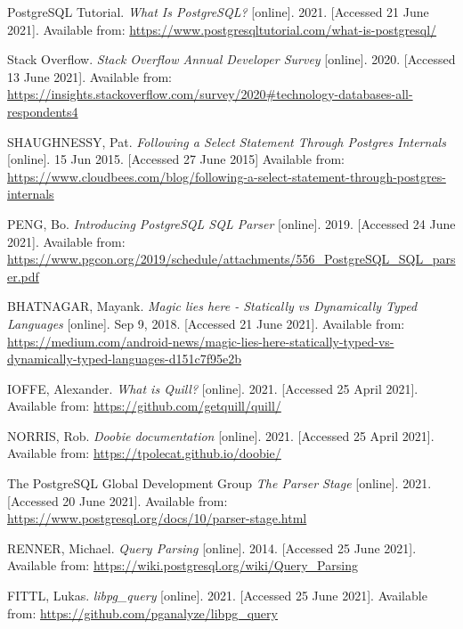 \documentclass[thesis=B,english]{FITthesis}[2019/12/23]
\begin{document}


\begin{thebibliography}{9}

PostgreSQL Tutorial.
\textit {What Is PostgreSQL?} [online]. 2021. [Accessed 21 June 2021]. Available from:
\url{https://www.postgresqltutorial.com/what-is-postgresql/}

Stack Overflow.
\textit {Stack Overflow Annual Developer Survey} [online]. 2020. [Accessed 13 June 2021].
Available from: \url{https://insights.stackoverflow.com/survey/2020\#technology-databases-all-respondents4}

SHAUGHNESSY, Pat.
\textit{Following a Select Statement Through Postgres Internals} [online]. 15 Jun 2015. [Accessed 27 June 2015] Available from: \url{https://www.cloudbees.com/blog/following-a-select-statement-through-postgres-internals}

PENG, Bo.
\textit {Introducing PostgreSQL SQL Parser} [online]. 2019. [Accessed 24 June 2021]. Available from:
\url{https://www.pgcon.org/2019/schedule/attachments/556\_PostgreSQL\_SQL\_parser.pdf}

BHATNAGAR, Mayank.
\textit {Magic lies here - Statically vs Dynamically Typed Languages} [online]. Sep 9, 2018. [Accessed 21 June 2021]. Available from: \url{https://medium.com/android-news/magic-lies-here-statically-typed-vs-dynamically-typed-languages-d151c7f95e2b}

IOFFE, Alexander.
\textit {What is Quill?} [online]. 2021. [Accessed 25 April 2021]. Available from: \url{https://github.com/getquill/quill/}

NORRIS, Rob. 
\textit {Doobie documentation} [online]. 2021. [Accessed 25 April 2021]. Available from: \url{https://tpolecat.github.io/doobie/}

The PostgreSQL Global Development Group
\textit{The Parser Stage} [online]. 2021. [Accessed 20 June 2021]. Available from: \url{https://www.postgresql.org/docs/10/parser-stage.html}

RENNER, Michael.
\textit {Query Parsing} [online]. 2014. [Accessed 25 June 2021]. Available from:
\url{https://wiki.postgresql.org/wiki/Query\_Parsing}

FITTL, Lukas.
\textit {libpg\_query} [online]. 2021. [Accessed 25 June 2021]. Available from:
\url{https://github.com/pganalyze/libpg\_query}


\end{thebibliography}
\end{document}
